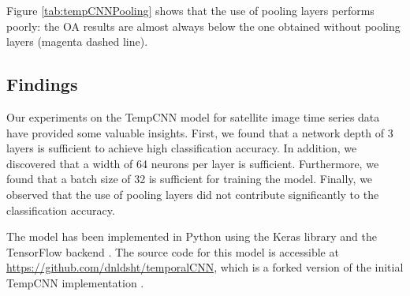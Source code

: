 Figure \ref{tab:tempCNNPooling} shows that the use of pooling layers performs poorly: the OA results are almost always
below the one obtained without pooling layers (magenta dashed line). 

\subsection{Findings}

Our experiments on the TempCNN model for satellite image time series data have provided some valuable insights. 
First, we found that a network depth of 3 layers is sufficient to achieve high classification accuracy. 
In addition, we discovered that a width of 64 neurons per layer is sufficient. 
Furthermore, we found that a batch size of 32 is sufficient for training the model. 
Finally, we observed that the use of pooling layers did not contribute significantly to the classification accuracy.

The model has been implemented in Python using the Keras library \cite{chollet2015keras} and the TensorFlow backend \cite{tensorflow2015-whitepaper}.
The source code for this model is accessible at \url{https://github.com/dnldsht/temporalCNN}, which is a forked version of the initial TempCNN implementation \cite{tempCNN}.